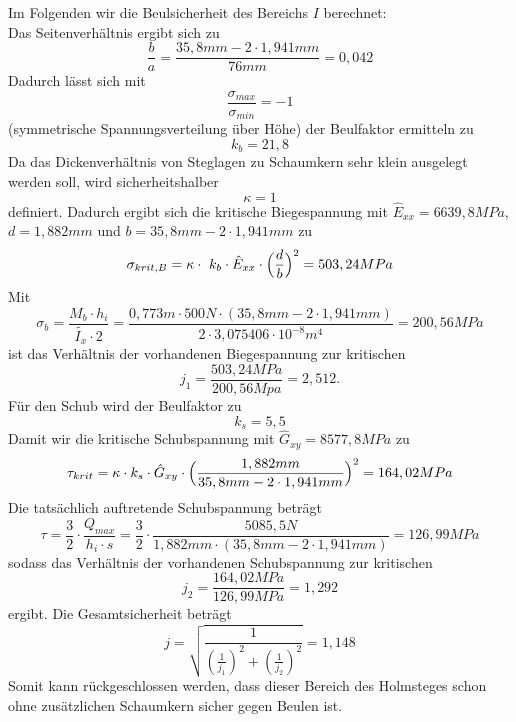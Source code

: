 \noindent Im Folgenden wir die Beulsicherheit des Bereichs $I$ berechnet:\\
\noindent Das Seitenverhältnis ergibt sich zu 
\begin{equation}
	\frac{b}{a}=\frac{35,8 mm-2\cdot 1,941 mm}{76 mm}=0,042
\end{equation}
Dadurch lässt sich mit 
\begin{equation}
	\frac{\sigma_{max}}{\sigma_{min}}=-1
\end{equation}
(symmetrische Spannungsverteilung über Höhe) der Beulfaktor ermitteln zu
\begin{equation}
	k_{b} = 21,8
\end{equation}
Da das Dickenverhältnis von Steglagen zu Schaumkern sehr klein ausgelegt werden soll, wird sicherheitshalber
\begin{equation}
	\kappa = 1
\end{equation}
definiert. Dadurch ergibt sich die kritische Biegespannung mit $\hat{E}_{xx}=6639,8MPa$, $d=1,882mm$ und $b=35,8mm-2\cdot 1,941mm$ zu
\begin{equation}
	\sigma_{krit,B}=\kappa\cdot\ k_{b}\cdot \hat{E}_{xx}\cdot\Bigl(\frac{d}{b}\Bigr)^{2}=503,24MPa
\end{equation}
Mit
\begin{equation}
	\sigma_{b}=\frac{M_{b}\cdot {h_{i}}}{\tilde{I_{x}}\cdot 2}=\frac{0,773m\cdot500N\cdot (35,8mm - 2\cdot 1,941mm)}{2\cdot 3,075406\cdot 10^{-8} m^{4} }=200,56 MPa
\end{equation}
ist das Verhältnis der vorhandenen Biegespannung zur kritischen 
\begin{equation}
	j_{1}=\frac{503,24MPa}{200,56 Mpa}=2,512.
\end{equation}
 Für den Schub wird der Beulfaktor zu
\begin{equation}
	k_{s}=5,5
\end{equation}
Damit wir die kritische Schubspannung mit $\hat{G}_{xy}=8577,8MPa$ zu 
\begin{equation}
	\tau_{krit}=\kappa\cdot k_{s}\cdot \hat{G}_{xy}\cdot\Bigl(\frac{1,88 2mm}{35,8 mm - 2\cdot 1,941  mm}\Bigr)^{2}=164,02 MPa
\end{equation}
Die tatsächlich auftretende Schubspannung beträgt 
\begin{equation}
	\tau= \frac{3}{2}\cdot\frac{Q_{max}}{h_{i}\cdot s} =\frac{3}{2}\cdot \frac{5085,5 N}{1,882 mm\cdot(35,8 mm-2\cdot 1,941 mm)}=126,99 MPa
\end{equation}
sodass das Verhältnis der vorhandenen Schubspannung zur kritischen 
\begin{equation}
	j_{2}=\frac{164,02 MPa}{126,99 MPa}= 1,292
\end{equation}
ergibt. Die Gesamtsicherheit beträgt
\begin{equation}
	j=\sqrt{\frac{1}{\left(\frac{1}{j_{1}}\right)^{2}+\left(\frac{1}{j_{2}}\right)^{2}}}=1,148
\end{equation}
Somit kann rückgeschlossen werden, dass dieser Bereich des Holmsteges schon ohne zusätzlichen Schaumkern sicher gegen Beulen ist.\\

